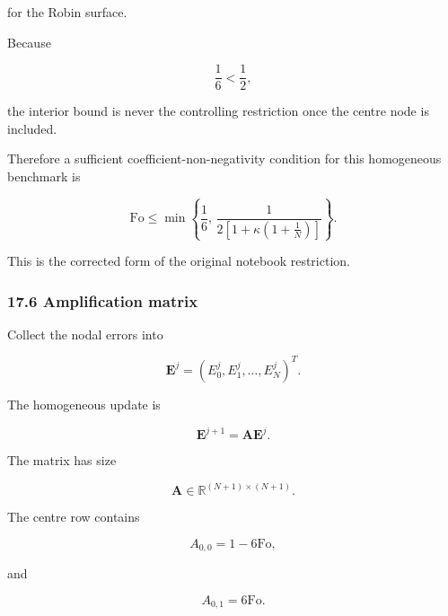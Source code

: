 \documentclass[11pt,a4paper]{article}
\begin{document}
for the Robin surface.

Because

\begin{equation}
\frac16<\frac12,
\tag{TRISO-DIS-539}
\label{eq:triso-dis-539}
\end{equation}

the interior bound is never the controlling restriction once the centre node is included.

Therefore a sufficient coefficient-non-negativity condition for this homogeneous benchmark is

\begin{equation}
\boxed{
\mathrm{Fo}
\le
\min
\left\{
\frac16,
\,
\frac{
1
}{
2\left[
1+\kappa\left(1+\frac1N\right)
\right]
}
\right\}.
}
\tag{TRISO-DIS-540}
\label{eq:triso-dis-540}
\end{equation}

This is the corrected form of the original notebook restriction.

\subsubsection*{17.6 Amplification matrix}

Collect the nodal errors into

\begin{equation}
\mathbf E^j
=
(E_0^j,E_1^j,\ldots,E_N^j)^T.
\tag{TRISO-DIS-541}
\label{eq:triso-dis-541}
\end{equation}

The homogeneous update is

\begin{equation}
\boxed{
\mathbf E^{j+1}
=
\mathbf A\mathbf E^j.
}
\tag{TRISO-DIS-542}
\label{eq:triso-dis-542}
\end{equation}

The matrix has size

\begin{equation}
\mathbf A\in\mathbb R^{(N+1)\times(N+1)}.
\tag{TRISO-DIS-543}
\label{eq:triso-dis-543}
\end{equation}

The centre row contains

\begin{equation}
A_{0,0}=1-6\mathrm{Fo},
\tag{TRISO-DIS-544}
\label{eq:triso-dis-544}
\end{equation}

and

\begin{equation}
A_{0,1}=6\mathrm{Fo}.
\tag{TRISO-DIS-545}
\label{eq:triso-dis-545}
\end{equation}
\end{document}

